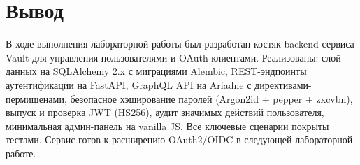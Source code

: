 \documentclass[oneside,a4paper,14pt]{extarticle}
\begin{document}
\clearpage
\section*{Вывод}
В ходе выполнения лабораторной работы был разработан костяк backend-сервиса Vault для управления пользователями и OAuth-клиентами. Реализованы: слой данных на SQLAlchemy 2.x с миграциями Alembic, REST-эндпоинты аутентификации на FastAPI, GraphQL API на Ariadne с директивами-пермишенами, безопасное хэширование паролей (Argon2id + pepper + zxcvbn), выпуск и проверка JWT (HS256), аудит значимых действий пользователя, минимальная админ-панель на vanilla JS. Все ключевые сценарии покрыты тестами. Сервис готов к расширению OAuth2/OIDC в следующей лабораторной работе.
\end{document}

